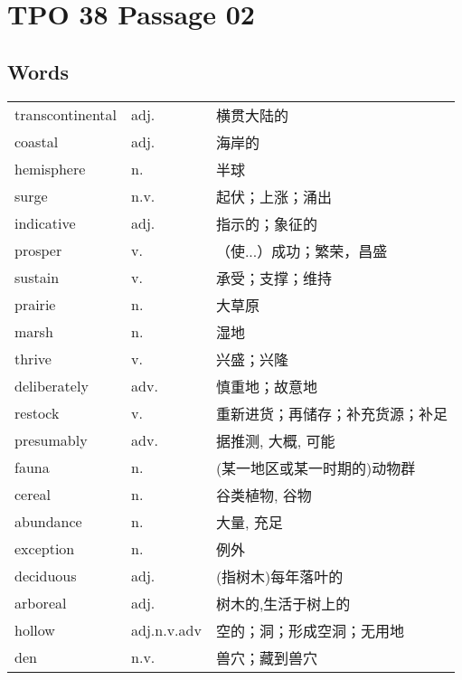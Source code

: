 \section{TPO 38 Passage 02}

\subsection{Words}

\begin{tabular}{lll}
    transcontinental & adj.        & 横贯大陆的            \\
    coastal          & adj.        & 海岸的              \\
    hemisphere       & n.          & 半球               \\
    surge            & n.v.        & 起伏；上涨；涌出         \\
    indicative       & adj.        & 指示的；象征的          \\
    prosper          & v.          & （使...）成功；繁荣，昌盛   \\
    sustain          & v.          & 承受；支撑；维持         \\
    prairie          & n.          & 大草原              \\
    marsh            & n.          & 湿地               \\
    thrive           & v.          & 兴盛；兴隆            \\
    deliberately     & adv.        & 慎重地；故意地          \\
    restock          & v.          & 重新进货；再储存；补充货源；补足 \\
    presumably       & adv.        & 据推测, 大概, 可能      \\
    fauna            & n.          & (某一地区或某一时期的)动物群  \\
    cereal           & n.          & 谷类植物, 谷物         \\
    abundance        & n.          & 大量, 充足           \\
    exception        & n.          & 例外               \\
    deciduous        & adj.        & (指树木)每年落叶的       \\
    arboreal         & adj.        & 树木的,生活于树上的       \\
    hollow           & adj.n.v.adv & 空的；洞；形成空洞；无用地    \\
    den              & n.v.        & 兽穴；藏到兽穴          \\
\end{tabular}

